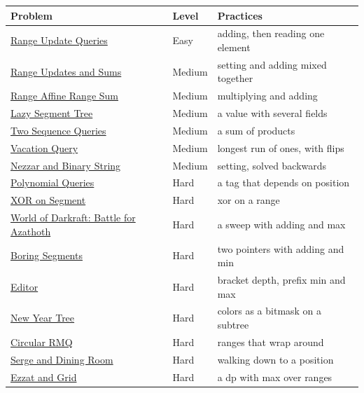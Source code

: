 \begin{center}
\begin{tabular}{@{}lll@{}}
\toprule
Problem & Level & Practices \\
\midrule
\href{https://cses.fi/problemset/task/1651}{Range Update Queries} & Easy & adding, then reading one element \\
\href{https://cses.fi/problemset/task/1735}{Range Updates and Sums} & Medium & setting and adding mixed together \\
\href{https://atcoder.jp/contests/practice2/tasks/practice2_k}{Range Affine Range Sum} & Medium & multiplying and adding \\
\href{https://atcoder.jp/contests/practice2/tasks/practice2_l}{Lazy Segment Tree} & Medium & a value with several fields \\
\href{https://atcoder.jp/contests/abc357/tasks/abc357_f}{Two Sequence Queries} & Medium & a sum of products \\
\href{https://atcoder.jp/contests/abc322/tasks/abc322_f}{Vacation Query} & Medium & longest run of ones, with flips \\
\href{https://codeforces.com/problemset/problem/1477/B}{Nezzar and Binary String} & Medium & setting, solved backwards \\
\href{https://cses.fi/problemset/task/1736}{Polynomial Queries} & Hard & a tag that depends on position \\
\href{https://codeforces.com/problemset/problem/242/E}{XOR on Segment} & Hard & xor on a range \\
\href{https://codeforces.com/problemset/problem/1320/C}{World of Darkraft: Battle for Azathoth} & Hard & a sweep with adding and max \\
\href{https://codeforces.com/problemset/problem/1555/E}{Boring Segments} & Hard & two pointers with adding and min \\
\href{https://codeforces.com/problemset/problem/1263/E}{Editor} & Hard & bracket depth, prefix min and max \\
\href{https://codeforces.com/problemset/problem/620/E}{New Year Tree} & Hard & colors as a bitmask on a subtree \\
\href{https://codeforces.com/problemset/problem/52/C}{Circular RMQ} & Hard & ranges that wrap around \\
\href{https://codeforces.com/problemset/problem/1179/C}{Serge and Dining Room} & Hard & walking down to a position \\
\href{https://codeforces.com/problemset/problem/1557/D}{Ezzat and Grid} & Hard & a dp with max over ranges \\

\end{tabular}
\end{center}
